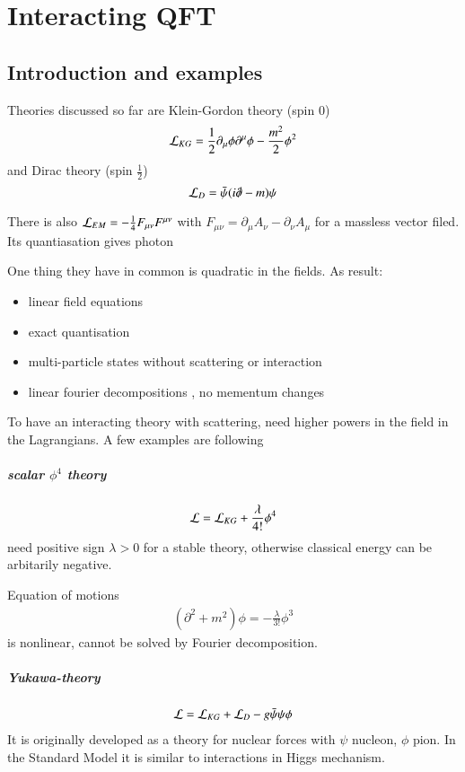 \chapter{Interacting QFT}
\section{Introduction and examples}
Theories discussed so far are Klein-Gordon theory (spin $0$) $$\mathcal{L}_{KG} = \frac{1}{2}\partial_\mu\phi\partial^\mu\phi - \frac{m^2}{2}\phi^2$$ and Dirac theory (spin $\frac{1}{2}$) $$\mathcal{L}_D = \bar{\psi}(i\slashed{\partial} - m) \psi $$

There is also $\mathcal{L}_{EM} = -\frac{1}{4}F_{\mu\nu}F^{\mu\nu}$ with $F_{\mu\nu} = \partial_\mu A_\nu - \partial_\nu A_\mu$ for a massless vector filed. Its quantiasation gives photon

One thing they have in common is quadratic in the fields. As result:
\begin{itemize}
	\item linear field equations
	\item exact quantisation
	\item multi-particle states without scattering or interaction
	\item linear fourier decompositions , no mementum changes
\end{itemize}

To have an interacting theory with scattering, need higher powers in the field in the Lagrangians. A few examples are following
\paragraph{scalar $\phi^4$ theory}
\begin{align}
	\mathcal{L} = \mathcal{L}_{KG} + \frac{\lambda}{4!} \phi^4
\end{align}
need positive sign $\lambda > 0$ for a stable theory, otherwise classical energy can be arbitarily negative.

Equation of motions
\begin{align}
	(\partial^2+ m ^2) \phi = -\frac{\lambda}{3!} \phi^3
\end{align}
is nonlinear, cannot be solved by Fourier decomposition.

\paragraph{Yukawa-theory}
\begin{align}
	\mathcal{L} = \mathcal{L}_{KG} + \mathcal{L}_{D} - g \bar{\psi}\psi \phi
\end{align}
It is originally developed as a theory for nuclear forces with $\psi$ nucleon, $\phi$ pion. In the Standard Model it is similar to interactions in Higgs mechanism.
